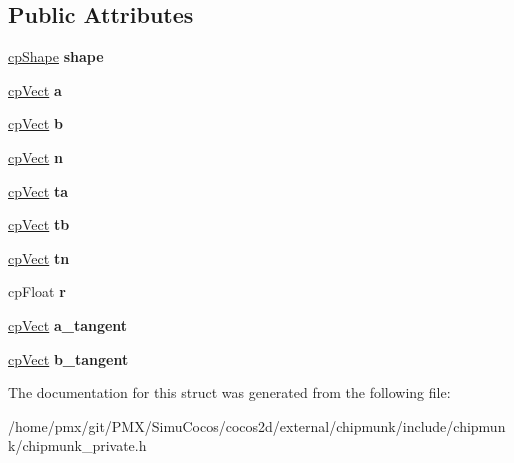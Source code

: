 \subsection*{Public Attributes}
\begin{DoxyCompactItemize}
\item 
\mbox{\label{structcpSegmentShape_a297ffe552e3a9d7ae39737826c67d3f9}} 
\hyperlink{structcpShape}{cp\+Shape} {\bfseries shape}
\item 
\mbox{\label{structcpSegmentShape_a34a7cf4976358bd14bc0dbc662e22794}} 
\hyperlink{structcpVect}{cp\+Vect} {\bfseries a}
\item 
\mbox{\label{structcpSegmentShape_afa81da45c15f6482058f32ababf3c255}} 
\hyperlink{structcpVect}{cp\+Vect} {\bfseries b}
\item 
\mbox{\label{structcpSegmentShape_a0698e58f6324e4b040f0616c70e5de21}} 
\hyperlink{structcpVect}{cp\+Vect} {\bfseries n}
\item 
\mbox{\label{structcpSegmentShape_a7a9a854616a9bd489875be1642d775a5}} 
\hyperlink{structcpVect}{cp\+Vect} {\bfseries ta}
\item 
\mbox{\label{structcpSegmentShape_a391ea2a44caf04f55cd9301b12193490}} 
\hyperlink{structcpVect}{cp\+Vect} {\bfseries tb}
\item 
\mbox{\label{structcpSegmentShape_a7114c5b41b18413750ab73852fe45400}} 
\hyperlink{structcpVect}{cp\+Vect} {\bfseries tn}
\item 
\mbox{\label{structcpSegmentShape_a2db5751e3e61d439a73aad029e568a05}} 
cp\+Float {\bfseries r}
\item 
\mbox{\label{structcpSegmentShape_a3ba1032e0a8842a0a0eda12e42cb710f}} 
\hyperlink{structcpVect}{cp\+Vect} {\bfseries a\+\_\+tangent}
\item 
\mbox{\label{structcpSegmentShape_aed400f79a3b1fa176382bb2912b7a0d7}} 
\hyperlink{structcpVect}{cp\+Vect} {\bfseries b\+\_\+tangent}
\end{DoxyCompactItemize}


The documentation for this struct was generated from the following file\+:\begin{DoxyCompactItemize}
\item 
/home/pmx/git/\+P\+M\+X/\+Simu\+Cocos/cocos2d/external/chipmunk/include/chipmunk/chipmunk\+\_\+private.\+h\end{DoxyCompactItemize}
